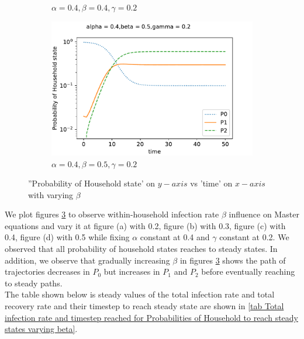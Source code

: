 \documentclass[paper=a4, fontsize=11pt, twoside, BCOR=12mm, parskip=full, listof=totoc]{scrreprt}
\begin{document}
{\begin{figure}[H]
\begin{subfigure}[b]{0.4\linewidth}
	  \caption{\(\alpha=0.4, \beta=0.4, \gamma=0.2\)}
	  \label{beta four}
	\end{subfigure}
	\begin{subfigure}[b]{0.4\linewidth}
	  \includegraphics[width=\linewidth]{sim/042_g16.pdf}
	  \caption{\(\alpha=0.4, \beta=0.5, \gamma=0.2\)}
	  \label{beta five}
	\end{subfigure}
	\caption{''Probability of Household state' on $y-axis$ vs 'time' on $x-axis$ with varying $\beta$}
	\label{fig Probability of Household state values varying beta}
	\end{figure}
	
We plot figures \ref{fig Probability of Household state values varying beta} to observe within-household infection rate $\beta$ influence on Master equations and vary it at figure (a) with 0.2, figure (b) with 0.3, figure (c) with 0.4, figure (d) with 0.5 while fixing $\alpha$ constant at 0.4 and $\gamma$ constant at 0.2. We observed that all probability of household states reaches to steady states. In addition, we observe that gradually increasing $\beta$ in figures \ref{fig Probability of Household state values varying beta} shows the path of trajectories decreases in $P_0$ but increases in $P_1$ and $P_2$ before eventually reaching to steady paths.\\  
The table shown below is steady values of the total infection rate and total recovery rate and their timestep to reach steady state are shown in \ref{tab Total infection rate and timestep reached for Probabilities of Household to reach steady states varying beta}.
 
}
\end{document}

